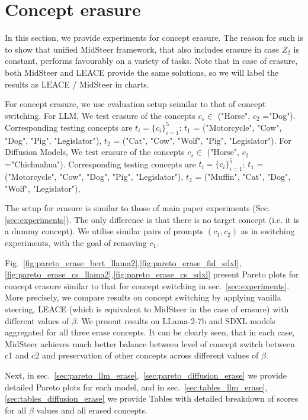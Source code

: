 \section{Concept erasure}
\label{sec:exp_concept_erasure}

In this section, we provide experiments for concept erasure. The reason for such is to show that unified MidSteer framework, that also includes erasure in case $Z_2$ is constant, performs favourably on a variety of tasks. Note that in case of erasure, both MidSteer and LEACE provide the same solutions, so we will label the results as LEACE / MidSteer in charts.

For concept erasure, we use evaluation setup seimilar to that of concept switching. For LLM, We test erasure of the concepts $c_s \in$ ("Horse", $c_2$ ="Dog"). Corresponding testing concepts are $t_i = \{c_i\}^5_{i=1}$: $t_1$ = ("Motorcycle", "Cow",  "Dog", "Pig", "Legislator"), $t_2$ = ("Cat", "Cow",  "Wolf", "Pig", "Legislator"). For Diffusion Models, We test erasure of the concepts $c_s \in$ ("Horse", $c_2$ ="Chichuahua"). Corresponding testing concepts are $t_i = \{c_i\}^5_{i=1}$: $t_1$ = ("Motorcycle", "Cow",  "Dog", "Pig", "Legislator"), $t_2$ = ("Muffin", "Cat",  "Dog", "Wolf", "Legislator"),

The setup for erasure is similar to those of main paper experiments (Sec. \ref{sec:experiments}). The only difference is that there is no target concept (i.e. it is a dummy concept). We utilise similar pairs of prompts $(c_1, c_2)$ as in switching experiments, with the goal of removing $c_1$.

Fig.~\ref{fig:pareto_erase_bert_llama2},\ref{fig:pareto_erase_fid_sdxl},\ref{fig:pareto_erase_cs_llama2},\ref{fig:pareto_erase_cs_sdxl} present Pareto plots for concept erasure similar to that for concept switching in sec.~\ref{sec:experiments}. More precisely, we compare results on concept switching by applying vanilla steering, LEACE (which is equivalent to MidSteer in the case of erasure) with different values of $\beta$. We present results on LLama-2-7b and SDXL models aggregated for all three erase concepts. It can be clearly seen, that in each case, MidSteer achieves much better balance between level of concept switch between c1 and c2 and preservation of other concepts across different values of $\beta$.

Next, in sec.~\ref{sec:pareto_llm_erase},~\ref{sec:pareto_diffusion_erase} we provide detailed Pareto plots for each model, and in sec.~\ref{sec:tables_llm_erase},\ref{sec:tables_diffusion_erase} we provide Tables with detailed breakdown of scores for all $\beta$ values and all erased concepts.


